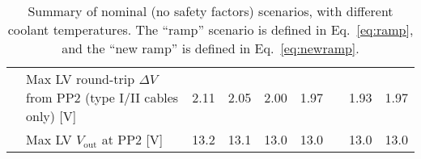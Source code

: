 \begin{table}[ht]
\begin{subtable}[t]{.99\linewidth}
\begin{centering}
{\begin{tabular}{|l|l|r|r|r|r|r|r|r|}
                                & Max LV round-trip $\Delta V$ from PP2 (type I/II cables only) [V]     &          2.11 &          2.05 &          2.00 &          1.97 &               &          1.93 &          1.97 \\
                                & Max LV $V_\text{out}$ at PP2 [V]                                      &          13.2 &          13.1 &          13.0 &          13.0 &               &          13.0 &          13.0 \\
\hline\end{tabular}
} %
\end{centering}
\caption{Summary of nominal (no safety factors) scenarios, with different coolant temperatures.
The ``ramp'' scenario is defined in Eq.~\ref{eq:ramp}, and the ``new ramp'' is defined in Eq.~\ref{eq:newramp}.
}
\end{subtable}

\vspace{5mm}


\end{table}
